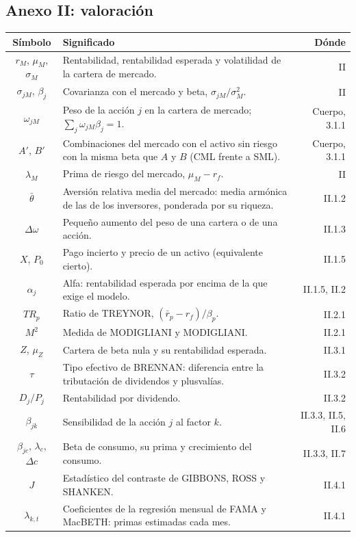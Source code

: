 \documentclass[10pt,a4paper]{article}
\newcommand{\cabecera}{\toprule\textbf{Símbolo} & \textbf{Significado} & \textbf{Dónde}\\\midrule\endhead\bottomrule\endfoot}
\begin{document}
\subsection*{Anexo II: valoración}
\begin{longtable}{SMD}
\cabecera
$r_M$, $\mu_M$, $\sigma_M$ & Rentabilidad, rentabilidad esperada y volatilidad de la cartera de mercado. & II\\
$\sigma_{jM}$, $\beta_j$ & Covarianza con el mercado y beta, $\sigma_{jM}/\sigma_M^2$. & II\\
$\omega_{jM}$ & Peso de la acción $j$ en la cartera de mercado; $\sum_j\omega_{jM}\beta_j=1$. & Cuerpo, 3.1.1\\
$A'$, $B'$ & Combinaciones del mercado con el activo sin riesgo con la misma beta que $A$ y $B$ (CML frente a SML). & Cuerpo, 3.1.1\\
$\lambda_M$ & Prima de riesgo del mercado, $\mu_M-r_f$. & II\\
$\bar\theta$ & Aversión relativa media del mercado: media armónica de las de los inversores, ponderada por su riqueza. & II.1.2\\
$\Delta\omega$ & Pequeño aumento del peso de una cartera o de una acción. & II.1.3\\
$X$, $P_0$ & Pago incierto y precio de un activo (equivalente cierto). & II.1.5\\
$\alpha_j$ & Alfa: rentabilidad esperada por encima de la que exige el modelo. & II.1.5, II.2\\
$\mathit{TR}_p$ & Ratio de TREYNOR, $(\bar r_p-r_f)/\beta_p$. & II.2.1\\
$M^2$ & Medida de MODIGLIANI y MODIGLIANI. & II.2.1\\
$Z$, $\mu_Z$ & Cartera de beta nula y su rentabilidad esperada. & II.3.1\\
$\tau$ & Tipo efectivo de BRENNAN: diferencia entre la tributación de dividendos y plusvalías. & II.3.2\\
$D_j/P_j$ & Rentabilidad por dividendo. & II.3.2\\
$\beta_{jk}$ & Sensibilidad de la acción $j$ al factor $k$. & II.3.3, II.5, II.6\\
$\beta_{jc}$, $\lambda_c$, $\Delta c$ & Beta de consumo, su prima y crecimiento del consumo. & II.3.3, II.7\\
$J$ & Estadístico del contraste de GIBBONS, ROSS y SHANKEN. & II.4.1\\
$\lambda_{k,t}$ & Coeficientes de la regresión mensual de FAMA y MacBETH: primas estimadas cada mes. & II.4.1\\

\end{longtable}
\end{document}
